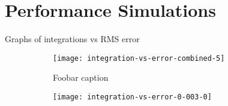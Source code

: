 \section{Performance Simulations}
Graphs of integrations vs RMS error

\begin{figure}
  \centering
  \begin{subfigure}{\textwidth}
    \centering
    \texttt{[image: integration-vs-error-combined-5]}
    \caption{Foobar caption}
  \end{subfigure}
  \begin{subfigure}{\textwidth}
    \centering
    \texttt{[image: integration-vs-error-0-003-0]}
  \end{subfigure}
\end{figure}
